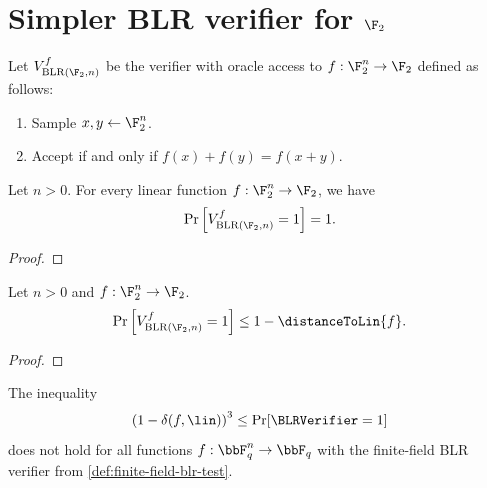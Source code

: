 \section{Simpler BLR verifier for \(\F_{2}\)}
\begin{definition}\label{BLR.basicVerifier}
\leanok 
Let \(V_{\mathrm{BLR}(\F_{2}, n)}^{f}\) be the verifier with oracle access to \(f: \F_{2}^n \to \F_{2}\) defined as follows:
\begin{enumerate}
  \item Sample \(x, y \leftarrow \F_2^n\).
  \item Accept if and only if \(f(x) + f(y) = f(x+y)\).
\end{enumerate}
\end{definition}

\begin{theorem}\label{BLR_basic_completeness_ZMod2}
\leanok
Let \(n > 0\). For every linear function \(f: \F_{2}^n \to \F_{2}\), we have
\[\Pr \left[V_{\mathrm{BLR}(\F_{2}, n)}^{f} = 1\right] = 1.\]
\end{theorem}
\begin{proof}\leanok
\end{proof}

\begin{theorem}\label{BLR_basic_soundness_ZMod2}
  \leanok
Let \(n > 0\) and \(f: \F_{2}^n \to \F_{2}\).
\[\Pr \left[V_{\mathrm{BLR}(\F_{2}, n)}^{f} = 1\right] \leq 1 - \distanceToLin{f}.\]
\end{theorem}
\begin{proof}\leanok
\end{proof}


\begin{theorem}
\label{thm:blr-cubic-lower-bound-counterexample}
The inequality
\[
    \left(1-\delta(f,\lin)\right)^3
    \le
    \Pr[\BLRVerifier=1]
\]
does not hold for all functions $f:\bbF_q^n\to\bbF_q$ with the finite-field BLR verifier
from \cref{def:finite-field-blr-test}.
\end{theorem}

